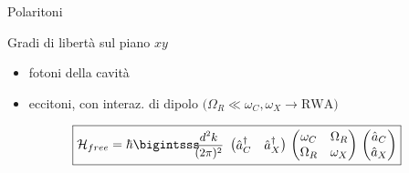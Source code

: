 \begin{frame}{Polaritoni}


  Gradi di libertà sul piano $xy$
  \begin{itemize}
    \item fotoni della cavità
    \item eccitoni, con interaz. di dipolo \(\big(\Omega_R \ll \omega_C, \omega_X \rightarrow \text{RWA}\big)\)
  \end{itemize}

  
 \begin{equation*}
 \boxed{
     \ham_{free} = \hbar \displaystyle \intk
      \begin{pmatrix} \oa_C^\dagger & \oa_X^\dagger \end{pmatrix}\,
      \begin{pmatrix} \omega_C & \Omega_R \\ \Omega_R & \omega_X \end{pmatrix}\,\begin{pmatrix}\oa_C \\ \oa_X \end{pmatrix}
    }  
   \end{equation*}

\vspace{-15pt}
\begin{minipage}{\textwidth}
\end{minipage}
\end{frame}

